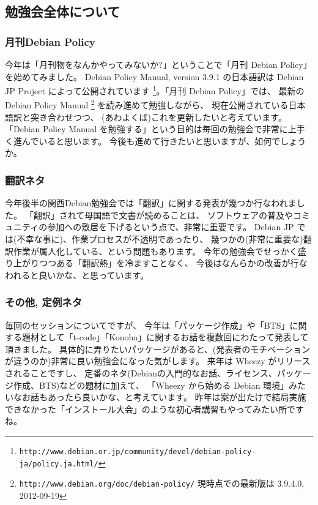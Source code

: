 \documentclass[mingoth,a4paper]{jsarticle}
\begin{document}
\subsection{勉強会全体について}

\subsubsection{月刊Debian Policy}
今年は「月刊物をなんかやってみないか?」ということで「月刊 Debian Policy」を始めてみました。
Debian Policy Manual, version 3.9.1 の日本語訳は Debian JP Project によって公開されています
\footnote{
  \texttt{http://www.debian.or.jp/community/devel/debian-policy-ja/policy.ja.html/}
}。「月刊 Debian Policy」では、
最新の Debian Policy Manual
\footnote{
  \texttt{http://www.debian.org/doc/debian-policy/}\newline
  現時点での最新版は 3.9.4.0, 2012-09-19
} を読み進めて勉強しながら、
現在公開されている日本語訳と突き合わせつつ、
(あわよくば)これを更新したいと考えています。
「Debian Policy Manual を勉強する」という目的は毎回の勉強会で非常に上手く進んでいると思います。
今後も進めて行きたいと思いますが、如何でしょうか。

\subsubsection{翻訳ネタ}

今年後半の関西Debian勉強会では「翻訳」に関する発表が幾つか行なわれました。
「翻訳」されて母国語で文書が読めることは、
ソフトウェアの普及やコミュニティの参加への敷居を下げるという点で、非常に重要です。
Debian JP では(不幸な事に)、作業プロセスが不透明であったり、
幾つかの(非常に重要な)翻訳作業が属人化している、という問題もあります。
今年の勉強会でせっかく盛り上がりつつある「翻訳熱」を冷ますことなく、
今後はなんらかの改善が行なわれると良いかな、と思っています。

\subsubsection{その他, 定例ネタ}

毎回のセッションについてですが、
今年は「パッケージ作成」や「BTS」に関する題材として「t-code」「Konoha」に関するお話を複数回にわたって発表して頂きました。
具体的に弄りたいパッケージがあると、(発表者のモチベーションが違うのか)非常に良い勉強会になった気がします。
来年は Wheezy がリリースされることですし、
定番のネタ(Debianの入門的なお話、ライセンス、パッケージ作成、BTS)などの題材に加えて、
「Wheezy から始める Debian 環境」みたいなお話もあったら良いかな、と考えています。
昨年は案が出たけで結局実施できなかった「インストール大会」のような初心者講習もやってみたい所ですね。
\end{document}
